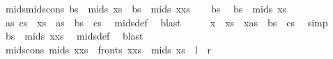 \begin{isabellebody}
\isanewline
{}\isamarkupfalse%
\ mids{\isacharunderscore}{\kern0pt}mids{\isacharunderscore}{\kern0pt}cons{\isacharcolon}{\kern0pt}\ {\isachardoublequoteopen}bs\ {\isasymin}\ mids\ xs\ {\isasymLongrightarrow}\ bs\ {\isasymin}\ mids\ {\isacharparenleft}{\kern0pt}x{\isacharhash}{\kern0pt}xs{\isacharparenright}{\kern0pt}{\isachardoublequoteclose}\isanewline
%
\isadelimproof
%
\endisadelimproof
%
\isatagproof
{}\isamarkupfalse%
{\isacharminus}{\kern0pt}\isanewline
\ \ \isamarkupfalse%
\ bs\ \isamarkupfalse%
\ {\isachardoublequoteopen}bs\ {\isasymin}\ mids\ xs{\isachardoublequoteclose}\isanewline
\ \ \isamarkupfalse%
\ \isamarkupfalse%
\ as\ cs\ \ {\isachardoublequoteopen}xs\ {\isacharequal}{\kern0pt}\ as\ {\isacharat}{\kern0pt}\ bs\ {\isacharat}{\kern0pt}\ cs{\isachardoublequoteclose}\ \isamarkupfalse%
\ mids{\isacharunderscore}{\kern0pt}def\ \isamarkupfalse%
\ blast\isanewline
\ \ \isamarkupfalse%
\ \isamarkupfalse%
\ {\isachardoublequoteopen}x\ {\isacharhash}{\kern0pt}\ xs\ {\isacharequal}{\kern0pt}\ {\isacharparenleft}{\kern0pt}x{\isacharhash}{\kern0pt}as{\isacharparenright}{\kern0pt}\ {\isacharat}{\kern0pt}\ bs\ {\isacharat}{\kern0pt}\ cs{\isachardoublequoteclose}\ \isamarkupfalse%
\ simp\isanewline
\ \ \isamarkupfalse%
\ \isamarkupfalse%
\ {\isachardoublequoteopen}bs\ {\isasymin}\ mids\ {\isacharparenleft}{\kern0pt}x{\isacharhash}{\kern0pt}xs{\isacharparenright}{\kern0pt}{\isachardoublequoteclose}\ \isamarkupfalse%
\ mids{\isacharunderscore}{\kern0pt}def\ \isamarkupfalse%
\ blast\isanewline
{}\isamarkupfalse%
%
\endisatagproof
{\isafoldproof}%
%
\isadelimproof
\isanewline
%
\endisadelimproof
\isanewline
{}\isamarkupfalse%
\ mids{\isacharunderscore}{\kern0pt}cons{\isacharcolon}{\kern0pt}\ {\isachardoublequoteopen}mids\ {\isacharparenleft}{\kern0pt}x{\isacharhash}{\kern0pt}xs{\isacharparenright}{\kern0pt}\ {\isacharequal}{\kern0pt}\ fronts\ {\isacharparenleft}{\kern0pt}x{\isacharhash}{\kern0pt}xs{\isacharparenright}{\kern0pt}\ {\isasymunion}\ mids\ xs{\isachardoublequoteclose}\ {\isacharparenleft}{\kern0pt}\ {\isachardoublequoteopen}{\isacharquery}{\kern0pt}l\ {\isacharequal}{\kern0pt}\ {\isacharquery}{\kern0pt}r{\isachardoublequoteclose}{\isacharparenright}{\kern0pt}\isanewline
%
\isadelimproof
%
\endisadelimproof
%
\isatagproof
{}\isamarkupfalse%

\end{isabellebody}
